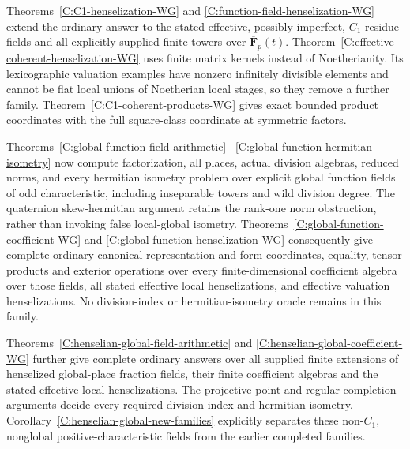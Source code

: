 \begin{remark}
Theorems~\ref{C:C1-henselization-WG} and
\ref{C:function-field-henselization-WG} extend the ordinary answer to
the stated effective, possibly imperfect, $C_1$ residue fields and
all explicitly supplied finite towers over $\overline{\mathbf F}_p(t)$.
Theorem~\ref{C:effective-coherent-henselization-WG} uses finite matrix
kernels instead of Noetherianity. Its lexicographic valuation examples
have nonzero infinitely divisible elements and cannot be flat local
unions of Noetherian local stages, so they remove a further family.
Theorem~\ref{C:C1-coherent-products-WG} gives exact bounded product
coordinates with the full square-class coordinate at symmetric factors.

Theorems~\ref{C:global-function-field-arithmetic}--
\ref{C:global-function-hermitian-isometry} now compute factorization,
all places, actual division algebras, reduced norms, and every hermitian
isometry problem over explicit global function fields of odd
characteristic, including inseparable towers and wild division degree.
The quaternion skew-hermitian argument retains the rank-one norm
obstruction, rather than invoking false local-global isometry.
Theorems~\ref{C:global-function-coefficient-WG} and
\ref{C:global-function-henselization-WG} consequently give complete
ordinary canonical representation and form coordinates, equality,
tensor products and exterior operations over every finite-dimensional
coefficient algebra over those fields, all stated effective local
henselizations, and effective valuation henselizations. No division-index
or hermitian-isometry oracle remains in this family.

Theorems~\ref{C:henselian-global-field-arithmetic} and
\ref{C:henselian-global-coefficient-WG} further give complete ordinary
answers over all supplied finite extensions of henselized global-place
fraction fields, their finite coefficient algebras and the stated effective
local henselizations. The projective-point and regular-completion arguments
decide every required division index and hermitian isometry.
Corollary~\ref{C:henselian-global-new-families} explicitly separates
these non-$C_1$, nonglobal positive-characteristic fields from the earlier
completed families.


\end{remark}
